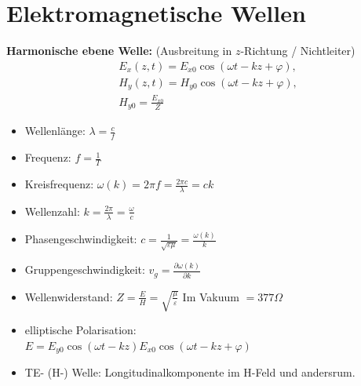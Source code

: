 \documentclass[german]{latex4ei/latex4ei_sheet}
\begin{document}
\section{Elektromagnetische Wellen}
\begin{sectionbox}
    \textbf{Harmonische ebene Welle:} (Ausbreitung in $z$-Richtung / Nichtleiter) \\
    \[
    \begin{aligned}
        & E_x(z, t) = E_{x0} \cos(\omega t - kz + \varphi), \\
        & H_y(z, t) = H_{y0} \cos(\omega t - kz + \varphi), \\
        & H_{y0} = \frac{E_{x0}}{Z}
    \end{aligned}
    \]
    \begin{itemize}
        \item Wellenlänge: $\lambda = \frac{c}{f}$ \vspace{1mm}
        \item Frequenz: $f = \frac{1}{T}$ \vspace{1mm}
        \item Kreisfrequenz: $\omega(k) = 2\pi f = \frac{2\pi c}{\lambda} = ck$ \vspace{1mm}
        \item Wellenzahl: $k = \frac{2\pi}{\lambda} = \frac{\omega}{c}$ \vspace{1mm}
        \item Phasengeschwindigkeit: $c = \frac{1}{\sqrt{\varepsilon \mu}} = \frac{\omega(k)}{k}$ \vspace{1mm}
        \item Gruppengeschwindigkeit: $v_g = \frac{\partial \omega(k)}{\partial k}$ \vspace{1mm}
        \item Wellenwiderstand: $Z = \frac{E}{H} = \sqrt{\frac{\mu}{\varepsilon}}$ \hspace{5mm} Im Vakuum $= 377 \Omega$ \vspace{1mm}
        \item elliptische Polarisation: \\ $E = E_{y0} \cos(\omega t - kz) E_{x0} \cos(\omega t - kz + \varphi)$ \vspace{1mm}
        \item TE- (H-) Welle: Longitudinalkomponente im H-Feld und andersrum.
    \end{itemize}
    

\end{sectionbox}
\end{document}
